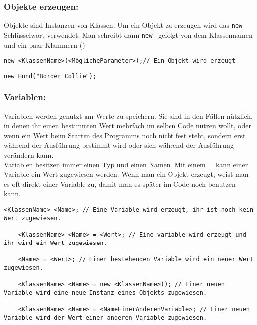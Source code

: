\begin{Infobox}
	
	\subsubsection*{Objekte erzeugen:}
	Objekte sind Instanzen von Klassen.
	Um ein Objekt zu erzeugen wird das \lstinline{new} Schlüsselwort verwendet.
	Man schreibt dann \lstinline{new } gefolgt von dem Klassennamen und ein paar Klammern ().
\end{Infobox}
\begin{lstlisting}[title=\textbf{Objekt erstellen Syntax}]
	new <KlassenName>(<MöglicheParameter>);// Ein Objekt wird erzeugt
\end{lstlisting}

\begin{lstlisting}[title=\textbf{Objekt erstellen Beispiel}]
	new Hund("Border Collie");
\end{lstlisting}
\begin{Infobox}
	\subsubsection*{Variablen:}
	Variablen werden genutzt um Werte zu speichern.
	Sie sind in den Fällen nützlich, in denen ihr einen bestimmten Wert mehrfach im selben Code nutzen wollt, oder wenn ein Wert beim Starten des Programms noch nicht fest steht, sondern erst während der Ausführung bestimmt wird oder sich während der Ausführung verändern kann.\\
	Variablen besitzen immer einen Typ und einen Namen.
	Mit einem = kann einer Variable ein Wert zugewiesen werden.
	Wenn man ein Objekt erzeugt, weist man es oft direkt einer Variable zu, damit man es später im Code noch benutzen kann.
\end{Infobox}
\begin{lstlisting}[title=\textbf{Variablen Syntax}]
	<KlassenName> <Name>; // Eine Variable wird erzeugt, ihr ist noch kein Wert zugewiesen.
	
	<KlassenName> <Name> = <Wert>; // Eine variable wird erzeugt und ihr wird ein Wert zugewiesen.
	
	<Name> = <Wert>; // Einer bestehenden Variable wird ein neuer Wert zugewiesen.
	
	<KlassenName> <Name> = new <KlassenName>(); // Einer neuen Variable wird eine neue Instanz eines Objekts zugewiesen.
	
	<KlassenName> <Name> = <NameEinerAnderenVariable>; // Einer neuen Variable wird der Wert einer anderen Variable zugewiesen. 
\end{lstlisting}
